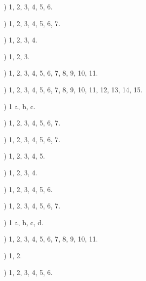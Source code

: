 \documentclass[a4paper,11pt]{article}
\numberwithin{equation}{section}
\begin{document}
\label{sec:Oznaczenia-i-konwencje}


\begin{itemize}

\item[\romannumeral1)] 1, 2, 3, 4, 5, 6.

\item[\romannumeral2)] 1, 2, 3, 4, 5, 6, 7.

\item[\romannumeral3)] 1, 2, 3, 4.

\item[\romannumeral4)] 1, 2, 3.

\item[\romannumeral5)] 1, 2, 3, 4, 5, 6, 7, 8, 9, 10, 11.

\item[\romannumeral6)] 1, 2, 3, 4, 5, 6, 7, 8, 9, 10, 11, 12, 13, 14, 15.

\item[\romannumeral7)] 1 a, b, c.

\item[\romannumeral8)] 1, 2, 3, 4, 5, 6, 7.

\item[\romannumeral10)] 1, 2, 3, 4, 5, 6, 7.

\item[\romannumeral11)] 1, 2, 3, 4, 5.

\item[\romannumeral12)] 1, 2, 3, 4.

\item[\romannumeral13)] 1, 2, 3, 4, 5, 6.

\item[\romannumeral14)] 1, 2, 3, 4, 5, 6, 7.

\item[\romannumeral15)] 1 a, b, c, d.

\item[\romannumeral17)] 1, 2, 3, 4, 5, 6, 7, 8, 9, 10, 11.

\item[\romannumeral20)] 1, 2.

\item[\romannumeral21)] 1, 2, 3, 4, 5, 6.

\end{itemize}
\end{document}

